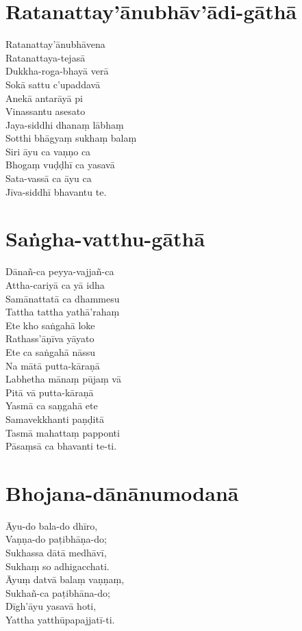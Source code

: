 \chapter{Ratanattay'ānubhāv'ādi-gāthā}

Ratanattay'ānubhāvena\\
Ratanattaya-tejasā\\
Dukkha-roga-bhayā verā\\
Sokā sattu c'upaddavā\\
Anekā antarāyā pi\\
Vinassantu asesato\\
Jaya-siddhi dhanaṃ lābhaṃ\\
Sotthi bhāgyaṃ sukhaṃ balaṃ\\
Siri āyu ca vaṇṇo ca\\
Bhogaṃ vuḍḍhī ca yasavā\\
Sata-vassā ca āyu ca\\
Jīva-siddhī bhavantu te.

\chapter{Saṅgha-vatthu-gāthā}

Dānañ-ca peyya-vajjañ-ca\\
Attha-cariyā ca yā idha\\
Samānattatā ca dhammesu\\
Tattha tattha yathā'rahaṃ\\
Ete kho saṅgahā loke\\
Rathass'āṇīva yāyato\\
Ete ca saṅgahā nāssu\\
Na mātā putta-kāraṇā\\
Labhetha mānaṃ pūjaṃ vā\\
Pitā vā putta-kāraṇā\\
Yasmā ca saṇgahā ete\\
Samavekkhanti paṇḍitā\\
Tasmā mahattaṃ papponti\\
Pāsaṃsā ca bhavanti te-ti.

\chapter{Bhojana-dānānumodanā}

Āyu-do bala-do dhīro,\\
Vaṇṇa-do paṭibhāṇa-do;\\
Sukhassa dātā medhāvī,\\
Sukhaṃ so adhigacchati.\\
Āyuṃ datvā balaṃ vaṇṇaṃ,\\
Sukhañ-ca paṭibhāna-do;\\
Dīgh'āyu yasavā hoti,\\
Yattha yatthūpapajjatī-ti.

